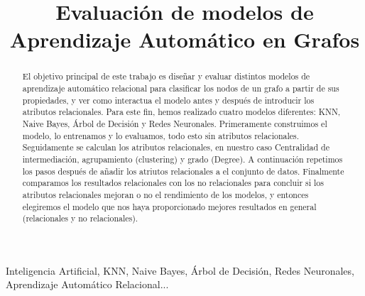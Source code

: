 \documentclass[conference,a4paper]{IEEEtran}
\begin{document}
\title{Evaluación de modelos de Aprendizaje Automático en Grafos}

\author{
  
  \and
  
}

\maketitle


\begin{abstract}

  El objetivo principal de este trabajo es diseñar y evaluar distintos modelos de aprendizaje automático       relacional para clasificar los nodos de un grafo a partir de sus propiedades, y ver como interactua el modelo  antes y después de introducir los atributos relacionales. 
  Para este fin, hemos realizado cuatro modelos diferentes: KNN, Naive Bayes, Árbol de Decisión y Redes Neuronales. Primeramente construimos el modelo, lo entrenamos y lo evaluamos, todo esto sin atributos relacionales. Seguidamente se calculan los atributos relacionales, en nuestro caso Centralidad de intermediación, agrupamiento (clustering) y grado (Degree). A continuación repetimos los pasos después de añadir los atriutos relacionales a el conjunto de datos. Finalmente comparamos los resultados relacionales con los no relacionales para concluir si los atributos relacionales mejoran o no el rendimiento de los modelos, y entonces elegiremos el modelo que nos haya proporcionado mejores resultados  en general (relacionales y no relacionales).

\end{abstract}


\begin{IEEEkeywords}
  Inteligencia Artificial, KNN, Naive Bayes, Árbol de Decisión, Redes Neuronales, Aprendizaje Automático Relacional...
\end{IEEEkeywords}
\end{document}
